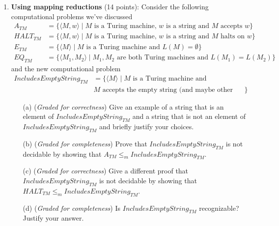 \documentclass[12pt, oneside]{article}
\newcommand{\gradeCorrect}{({\it Graded for correctness}) }
\newcommand{\gradeComplete}{({\it Graded for completeness}) }
\begin{document}
\begin{enumerate}[wide, labelwidth=!, labelindent=0pt]
\begin{enumerate}
\item\gradeCorrect $\Sigma^* \le_m \{w w \mid w \in \{0,1\}^* \}$ and
$f(x) = 11$ for each $x \in \{0,1\}^*$.


\end{enumerate}

\item\textbf{Using mapping reductions} (14 points):
Consider the following computational problems we've discussed
\begin{align*}
A_{TM} &= \{ \langle M, w \rangle \mid M \text{ is a Turing machine, } w \text{ is a string and $M$ accepts $w$}\} \\
HALT_{TM} &= \{ \langle M, w \rangle \mid M \text{ is a Turing machine, } w \text{ is a string and $M$ halts on $w$}\} \\
E_{TM} &=  \{ \langle M \rangle \mid M \text{ is a Turing machine and } L(M) = \emptyset\} \\
EQ_{TM} &= \{ \langle M_1, M_2 \rangle \mid M_1, M_2 \text{ are both Turing machines and } L(M_1) = L(M_2) \}
\end{align*}
and the new computational problem
\begin{align*}
    IncludesEmptyString_{TM} &= \{ \langle M \rangle \mid M \text{ is a Turing machine and }\\
    &\text{$M$ accepts the empty string (and maybe other strings too)} \}
\end{align*}

\begin{enumerate}
\item[(a)] \gradeCorrect Give an example of a string that is an element of $IncludesEmptyString_{TM}$ and a string that is not an element of
$IncludesEmptyString_{TM}$ and briefly justify your choices.
\item[(b)] \gradeComplete Prove that $IncludesEmptyString_{TM}$ is not decidable by showing that $A_{TM} \leq_m IncludesEmptyString_{TM}$.
\item[(c)] \gradeCorrect Give a different proof that $IncludesEmptyString_{TM}$ is not decidable by showing that $HALT_{TM} \leq_m IncludesEmptyString_{TM}$.
\item[(d)] \gradeComplete Is $IncludesEmptyString_{TM}$ recognizable? Justify your answer.
\end{enumerate}


\end{enumerate}
\end{document}
